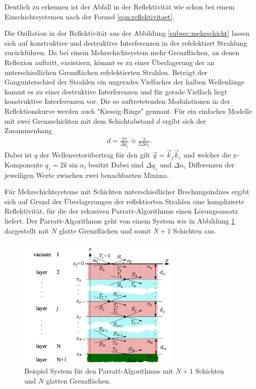 Deutlich zu erkennen ist der Abfall in der Reflektivität wie schon
bei einem Einschichtsystemen nach der Formel \eqref{eqn:reflektivitaet}.

Die Ozillation in der Reflektivität aus der Abbildung \ref{subsec:mehrschicht}
lassen sich auf konstruktive und destruktive Interferenzen in
der refelektiert Strahlung zurückführen.
Da bei einem Mehrschichtsystem mehr
Grenzflächen, an denen Reflexion auftritt, exsistiern,
kömmt es zu einer Überlagerung der an unterschiedlichen Grenzflächen
refelektierten Strahlen.
Beträgt der Gangunterschied der Strahlen
ein ungerades Vielfaches der halben Wellenlänge
kommt es zu einer destruktive Interferenzen und für gerade Vielfach
liegt konstruktive Interferenzen vor.
Die so auftretetenden
Modulationen in der Reflektionskurve
werden auch "Kiessig-Ringe" gennant.
Für ein einfaches Modelle mit zwei
Grenzschichten mit dem Schichtabstand $d$
ergibt sich der Zusammenhang
\begin{align}
  d = \frac{2\pi}{\Delta q_z} \approx \frac{\lambda}{2\Delta \alpha_i}. \label{eqn:schichtabstand}
\end{align}
Dabei ist $q$ der Wellenvetorübertrag für den gilt
$\vec{q} = \vec{k}_f \vec{k}_i$ und welcher die z-Komponente $q_z=2k\sin \alpha_i$ besitzt
Dabei sind $\Delta q_z$ und $\Delta\alpha_i$ Differenzen
der jeweiligen
Werte zwischen zwei benachbarten Minima. %

Für Mehrschichtsysteme mit Schichten
unterschiedlicher Brechungsindizes
ergibt sich auf Grund der Überlagerungen der reflektierten
Strahlen eine
komplizierte Reflektivität, für die der
rekusiven Parratt-Algorithmus einen Lösungsansatz
liefert.
Der Parratt-Algorithmus geht von einem System
wie in Abbildung \ref{fig:parratt_syst} dargestellt
mit $N$ glatte Grenzflächen und somit $N+1$ Schichten
aus.

\begin{figure}
  \centering
\includegraphics[width=0.7\textwidth]{bilder/mehrschicht_parratt.PNG}
\caption{Beispiel System für den Parratt-Algorithmus
mit $N+1$ Schichten und $N$ glatten Grenzflächen.\cite{sample}}
\label{fig:parratt_syst}
\end{figure}

